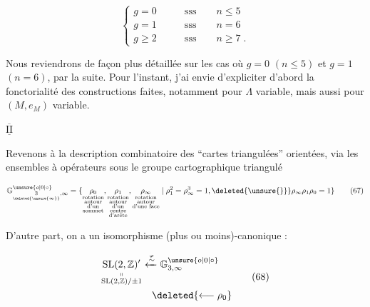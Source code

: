 
\[
\left\{\begin{aligned}
g=0&\qquad\text{sss}\qquad n\leq5\\
g=1&\qquad\text{sss}\qquad n=6\\
g\geq2&\qquad\text{sss}\qquad n\geq7\;.
\end{aligned}\right.\tag*{(66)}
\]

Nous reviendrons de façon plus détaillée sur les cas où $g=0$ $(n\leq5)$ et $g=1$ $(n=6)$, par la suite. Pour l'instant, j'ai envie d'expliciter d'abord la fonctorialité des constructions faites, notamment pour $\Lambda$ variable, mais aussi pour $(M,e_M)$ variable.

$\overline{\underline{\mathrm{II}}}$

Revenons à la description combinatoire  des ``cartes triangulées'' orientées, via les ensembles à opérateurs sous le groupe cartographique triangulé 

\[
\mathbb{G}^{\unsure{o|0|\circ}}_{\underset{\deleted{\unsure{\infty}}}{3},\infty}=
\{\underset{\substack{\text{rotation}\\\text{autour}\\\text{d'un}\\\text{sommet}}}{\rho_0},
\underset{\substack{\text{rotation}\\\text{autour}\\\text{d'un}\\\text{centre}\\\text{d'arête}}}{\rho_1},
\underset{\substack{\text{rotation}\\\text{autour}\\\text{d'une face}}}{\rho_\infty}
\mid \rho_1^2=\rho_\infty^3=1,\deleted{\unsure{\}}}
\rho_\infty\rho_1\rho_0=1\}\tag*{(67)}
\]

D'autre part, on a un isomorphisme (plus ou moins)-canonique :



\[
\begin{aligned}
\underset{\substack{\shortparallel\\\mathrm{SL}(2,\mathbb{Z})/{\pm1}}}{\mathrm{SL}(2,\mathbb{Z})'}&\xleftarrow{\overset{\varphi}{\sim}}\mathbb{G}^{\unsure{o|0|\circ}}_{3,\infty}\\
&\quad\deleted{\longleftarrow\rho_0}
\end{aligned}\tag*{(68)}
\]

